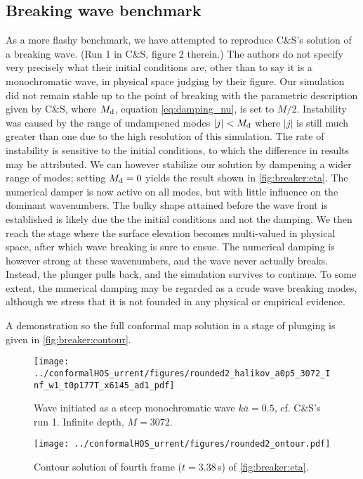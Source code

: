 \documentclass[a4paper,12pt]{article}
\renewcommand{\_}[1]{_\mr{#1}}
\newcommand{\refCS}{C\&S}
\begin{document}
\subsection*{Breaking wave benchmark}

As a more flashy benchmark, we have attempted to reproduce \refCS{}'s solution of a breaking wave. (Run 1 in \refCS{}, figure 2 therein.)
The authors do not specify very precisely what their initial conditions are, other than to say it is a monochromatic wave, in physical space judging by their figure.
Our simulation did not remain stable up to the point of breaking with the parametric description given by \refCS{}, where $M\_d$, equation \eqref{eq:damping_nu}, is set to $M/2$.
Instability was caused by the range of undampened modes $|j|<M\_d$ where $|j|$ is still much greater than one due to the high resolution of this simulation. 
The rate of instability is sensitive to the initial conditions, to which the difference in results may be attributed. 
We can however stabilize our solution by dampening a wider range of modes; setting $M\_d=0$ yields the result shown in \autoref{fig:breaker:eta}.
The numerical damper is now active on all modes, but with little influence on the dominant wavenumbers. 
The bulky shape attained before the wave front is established is likely due the the initial conditions and not the damping.
We then reach the stage where the surface elevation becomes multi-valued in physical space, after which wave breaking is sure to ensue. 
The numerical damping is however strong at these wavenumbers, and the wave never actually breaks.  
Instead, the plunger pulls back, and the simulation survives to continue. 
To some extent, the numerical damping may be regarded as a crude wave breaking modes, although we stress that it is not founded in any physical or empirical evidence. 

A demonstration so the full conformal map solution in a stage of plunging is given in \autoref{fig:breaker:contour}.
\\
\begin{figure}[h!ptb]%
\centering
\texttt{[image: ../conformalHOS\_current/figures/rounded2\_Chalikov\_ka0p5\_M3072\_hInf\_Nw1\_dt0p177T\_nx6145\_pad1\_.pdf]}%
\caption{Wave initiated as a steep monochromatic wave $k\bar a=0.5$, cf. \refCS{}'s run 1. Infinite depth, $M=3072$.}%
\label{fig:breaker:eta}%
\end{figure}
\begin{figure}[h!ptb]%
\centering
\texttt{[image: ../conformalHOS\_current/figures/rounded2\_contour.pdf]}%
\caption{Contour solution of fourth frame ($t=3.38$\,s) of \autoref{fig:breaker:eta}.}%
\label{fig:breaker:contour}%
\end{figure}
\end{document}
